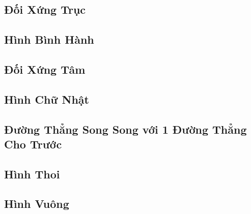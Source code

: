 \documentclass{article}
\numberwithin{equation}{section}
\begin{document}

\subsection{Đối Xứng Trục}


\subsection{Hình Bình Hành}


\subsection{Đối Xứng Tâm}


\subsection{Hình Chữ Nhật}


\subsection{Đường Thẳng Song Song với 1 Đường Thẳng Cho Trước}


\subsection{Hình Thoi}


\subsection{Hình Vuông}

\end{document}
